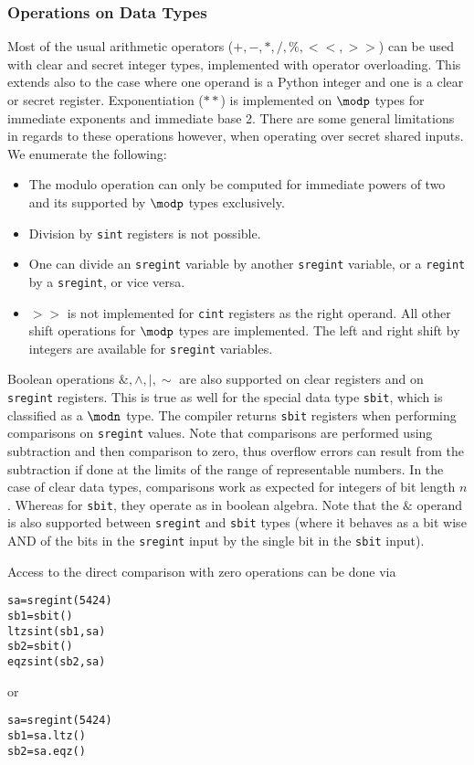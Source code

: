 \subsubsection{Operations on Data Types}
Most of the usual arithmetic operators ($+, -, *, /, \%, <<, >>$) can be used with
clear and secret integer types, implemented with operator overloading.
This extends also to the case where one operand is a Python integer and one
is a clear or secret register.
Exponentiation ($**$) is implemented on $\modp$ types for immediate exponents and
immediate base 2.
There are some general limitations in regards to these operations however, when operating over secret shared inputs. We enumerate the following:
\begin{itemize}
\item The modulo operation can only be computed for immediate powers
  of two and its supported by $\modp$ types exclusively.
\item Division by \verb|sint| registers is not possible. 
\item One can divide an  \verb|sregint| variable by another \verb|sregint| variable,
      or a \verb|regint| by a \verb|sregint|, or vice versa.
\item $>>$ is not implemented for \verb|cint| registers as the right operand. 
All other shift operations for $\modp$ types are implemented.
The left and right shift by integers are available for \verb|sregint| variables.
\end{itemize}
Boolean operations $\&, \wedge, |, \sim$ are also supported on clear registers
and on \verb|sregint| registers.
This is true as well for the special data type \verb|sbit|, 
which is classified as a $\modn$ type. 
The compiler returns \verb|sbit| registers when performing comparisons on \verb|sregint| values. 
Note that comparisons are performed using subtraction and then comparison to zero,
thus overflow errors can result from the subtraction if done at the limits of the range
of representable numbers.
In the case of clear data types, comparisons work as expected for integers of bit length $n$. Whereas for \verb|sbit|, they operate as in boolean algebra. Note that the $\&$ operand is also supported between \verb|sregint| and \verb|sbit| types 
(where it behaves as a bit wise AND of the bits in the \verb|sregint| input by the single bit in the
\verb|sbit| input).

Access to the direct comparison with zero operations can be done via
\begin{lstlisting}
sa=sregint(5424)
sb1=sbit()
ltzsint(sb1,sa)
sb2=sbit()
eqzsint(sb2,sa)
\end{lstlisting}
or
\begin{lstlisting}
sa=sregint(5424)
sb1=sa.ltz()
sb2=sa.eqz()
\end{lstlisting}


